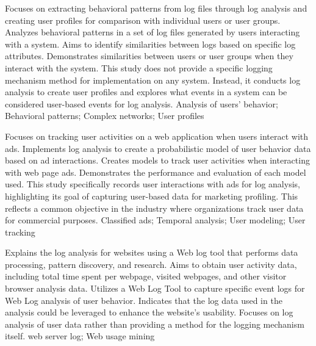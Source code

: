 {
    Focuses on extracting behavioral patterns from log files through log analysis and creating user profiles for comparison with individual users or user groups.
}
{
    Analyzes behavioral patterns in a set of log files generated by users interacting with a system. Aims to identify similarities between logs based on specific log attributes.
}
{
    Demonstrates similarities between users or user groups when they interact with the system.
}
{
    This study does not provide a specific logging mechanism method for implementation on any system. Instead, it conducts log analysis to create user profiles and explores what events in a system can be considered user-based events for log analysis.
}
{
    Analysis of users' behavior; Behavioral patterns; Complex networks; User profiles
}

{
    Focuses on tracking user activities on a web application when users interact with ads. Implements log analysis to create a probabilistic model of user behavior data based on ad interactions.
}
{
    Creates models to track user activities when interacting with web page ads.
}
{
    Demonstrates the performance and evaluation of each model used.
}
{
    This study specifically records user interactions with ads for log analysis, highlighting its goal of capturing user-based data for marketing profiling. This reflects a common objective in the industry where organizations track user data for commercial purposes.
}
{
    Classified ads; Temporal analysis; User modeling; User tracking
}

{
    Explains the log analysis for websites using a Web log tool that performs data processing, pattern discovery, and research. Aims to obtain user activity data, including total time spent per webpage, visited webpages, and other visitor browser analysis data.
}
{
    Utilizes a Web Log Tool to capture specific event logs for Web Log analysis of user behavior.
}
{
    Indicates that the log data used in the analysis could be leveraged to enhance the website's usability.
}
{
    Focuses on log analysis of user data rather than providing a method for the logging mechanism itself.
}
{
    web server log; Web usage mining
}